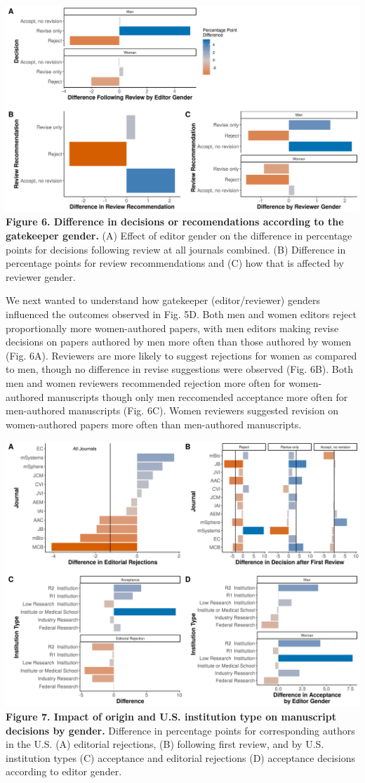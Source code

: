 \documentclass[11pt,]{article}
\begin{document}
\includegraphics{Figure_6.png} \textbf{Figure 6. Difference in decisions
or recomendations according to the gatekeeper gender.} (A) Effect of
editor gender on the difference in percentage points for decisions
following review at all journals combined. (B) Difference in percentage
points for review recommendations and (C) how that is affected by
reviewer gender.

We next wanted to understand how gatekeeper (editor/reviewer) genders
influenced the outcomes observed in Fig. 5D. Both men and women editors
reject proportionally more women-authored papers, with men editors
making revise decisions on papers authored by men more often than those
authored by women (Fig. 6A). Reviewers are more likely to suggest
rejections for women as compared to men, though no difference in revise
suggestions were observed (Fig. 6B). Both men and women reviewers
recommended rejection more often for women-authored manuscripts though
only men reccomended acceptance more often for men-authored manuscripts
(Fig. 6C). Women reviewers suggested revision on women-authored papers
more often than men-authored manuscripts.

\includegraphics{Figure_7.png} \textbf{Figure 7. Impact of origin and
U.S. institution type on manuscript decisions by gender.} Difference in
percentage points for corresponding authors in the U.S. (A) editorial
rejections, (B) following first review, and by U.S. institution types
(C) acceptance and editorial rejections (D) acceptance decisions
according to editor gender.
\end{document}
